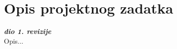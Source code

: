 \chapter{Opis projektnog zadatka}
		
		\textbf{\textit{dio 1. revizije}}\\
		
		Opis...
		\eject
		
		